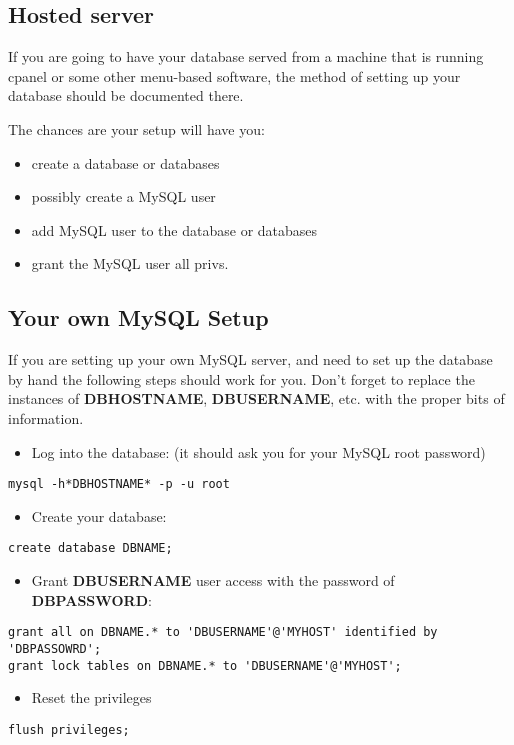 \documentclass[captions=tablesignature]{scrartcl}
\begin{document}
\subsection{Hosted server}
\label{sec-4-1}
If you are going to have your database served from a machine that
is running cpanel or some other menu-based software, the method of
setting up your database should be documented there.

The chances are your setup will have you:
\begin{itemize}
\item create a database or databases
\item possibly create a MySQL user
\item add MySQL user to the database or databases
\item grant the MySQL user all privs.
\end{itemize}

\subsection{Your own MySQL Setup}
\label{sec-4-2}
If you are setting up your own MySQL server, and need to set up the
database by hand the following steps should work for you.  Don't
forget to replace the instances of \textbf{DBHOSTNAME}, \textbf{DBUSERNAME},
etc. with the proper bits of information.

\begin{itemize}
\item Log into the database: (it should ask you for your MySQL root password)
\end{itemize}
\begin{verbatim}
mysql -h*DBHOSTNAME* -p -u root
\end{verbatim}
\begin{itemize}
\item Create your database:
\end{itemize}
\begin{verbatim}
create database DBNAME;
\end{verbatim}
\begin{itemize}
\item Grant \textbf{DBUSERNAME} user access with the password of \textbf{DBPASSWORD}:
\end{itemize}
\begin{verbatim}
grant all on DBNAME.* to 'DBUSERNAME'@'MYHOST' identified by 'DBPASSOWRD';
grant lock tables on DBNAME.* to 'DBUSERNAME'@'MYHOST';
\end{verbatim}
\begin{itemize}
\item Reset the privileges
\end{itemize}
\begin{verbatim}
flush privileges;
\end{verbatim}
\end{document}
